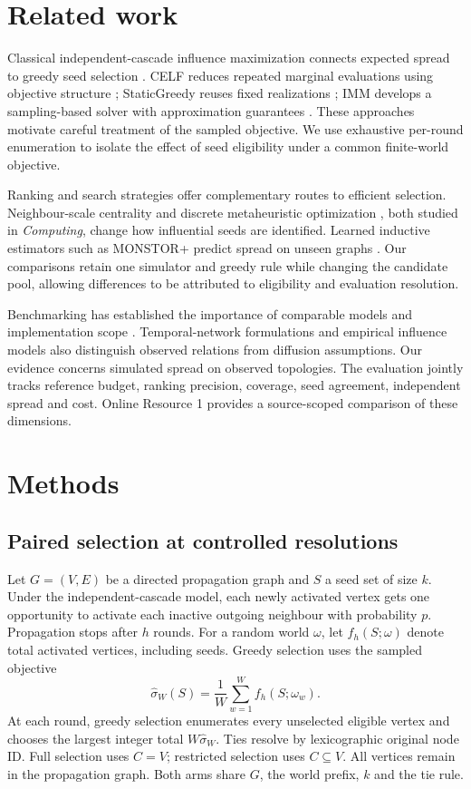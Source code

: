 \documentclass[smallextended]{svjour3}
\begin{document}
\section{Related work}
Classical independent-cascade influence maximization connects expected spread to greedy seed selection \cite{ref1}. CELF reduces repeated marginal evaluations using objective structure \cite{ref7}; StaticGreedy reuses fixed realizations \cite{ref8}; IMM develops a sampling-based solver with approximation guarantees \cite{ref2}. These approaches motivate careful treatment of the sampled objective. We use exhaustive per-round enumeration to isolate the effect of seed eligibility under a common finite-world objective.

Ranking and search strategies offer complementary routes to efficient selection. Neighbour-scale centrality \cite{ref12} and discrete metaheuristic optimization \cite{ref13}, both studied in \emph{Computing}, change how influential seeds are identified. Learned inductive estimators such as MONSTOR+ predict spread on unseen graphs \cite{ref19}. Our comparisons retain one simulator and greedy rule while changing the candidate pool, allowing differences to be attributed to eligibility and evaluation resolution.

Benchmarking has established the importance of comparable models and implementation scope \cite{ref16}. Temporal-network formulations \cite{ref11} and empirical influence models \cite{ref15} also distinguish observed relations from diffusion assumptions. Our evidence concerns simulated spread on observed topologies. The evaluation jointly tracks reference budget, ranking precision, coverage, seed agreement, independent spread and cost. Online Resource 1 provides a source-scoped comparison of these dimensions.

\section{Methods}
\subsection{Paired selection at controlled resolutions}
Let $G=(V,E)$ be a directed propagation graph and $S$ a seed set of size $k$. Under the independent-cascade model, each newly activated vertex gets one opportunity to activate each inactive outgoing neighbour with probability $p$. Propagation stops after $h$ rounds. For a random world $\omega$, let $f_h(S;\omega)$ denote total activated vertices, including seeds. Greedy selection uses the sampled objective
\begin{equation}
\widehat\sigma_W(S)=\frac{1}{W}\sum_{w=1}^{W}f_h(S;\omega_w).
\end{equation}
At each round, greedy selection enumerates every unselected eligible vertex and chooses the largest integer total $W\widehat\sigma_W$. Ties resolve by lexicographic original node ID. Full selection uses $C=V$; restricted selection uses $C\subseteq V$. All vertices remain in the propagation graph. Both arms share $G$, the world prefix, $k$ and the tie rule.
\end{document}
